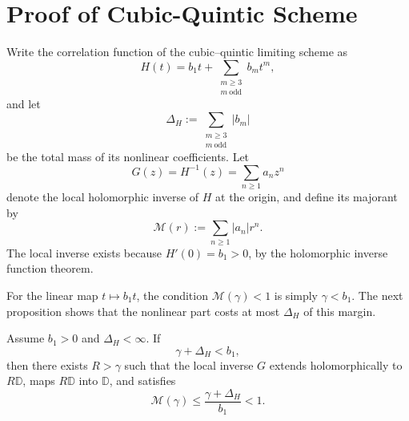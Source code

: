 \section{Proof of Cubic-Quintic Scheme}
\label{sec:certification}

Write the correlation function of the cubic--quintic limiting scheme as
\begin{equation}
  H(t)=b_1t+\sum_{\substack{m\ge 3\\ m\ \mathrm{odd}}} b_m t^m,
  \label{eq:certification-H-series}
\end{equation}
and let
\begin{equation}
  \Delta_H:=\sum_{\substack{m\ge 3\\ m\ \mathrm{odd}}}|b_m|
  \label{eq:nonlinear-coefficient-mass}
\end{equation}
be the total mass of its nonlinear coefficients.  Let
\[
  G(z)=H^{-1}(z)=\sum_{n\ge1}a_nz^n
\]
denote the local holomorphic inverse of $H$ at the origin, and define its
majorant by
\begin{equation}
  \mathcal M(r):=\sum_{n\ge1}|a_n|r^n.
  \label{eq:inverse-majorant-certification}
\end{equation}
The local inverse exists because $H'(0)=b_1>0$, by the holomorphic inverse
function theorem.

For the linear map $t\mapsto b_1t$, the condition $\mathcal M(\gamma)<1$ is
simply $\gamma<b_1$.  The next proposition shows that the nonlinear part costs
at most $\Delta_H$ of this margin.

\begin{proposition}
\label{prop:inverse-certificate-near-linearity}
Assume $b_1>0$ and $\Delta_H<\infty$.  If
\begin{equation}
  \gamma+\Delta_H<b_1,
  \label{eq:near-linearity-condition}
\end{equation}
then there exists $R>\gamma$ such that the local inverse $G$ extends
holomorphically to $R\mathbb D$, maps $R\mathbb D$ into $\mathbb D$, and
satisfies
\begin{equation}
  \mathcal M(\gamma)
  \le \frac{\gamma+\Delta_H}{b_1}
  <1.
  \label{eq:near-linearity-conclusion}
\end{equation}
\end{proposition}

